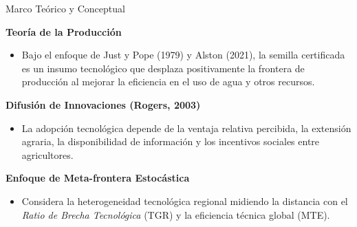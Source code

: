 \documentclass[t]{beamer}
\begin{document}
\begin{frame}[t]{Marco Teórico y Conceptual}
\hspace{0.2cm}
\begin{minipage}{0.92\textwidth}
\vspace{-0.4cm}
    \textbf{Teoría de la Producción}
    \vspace{0.05cm}
        \begin{itemize}
            \justifying
            \item Bajo el enfoque de Just y Pope (1979) y Alston (2021), la semilla certificada es un insumo tecnológico que desplaza positivamente la frontera de producción al mejorar la eficiencia en el uso de agua y otros recursos.
        \end{itemize}
        
    \vspace{0.05cm}
    \normalsize
    \textbf{Difusión de Innovaciones (Rogers, 2003)}
        \begin{itemize}
            \justifying
            \item La adopción tecnológica depende de la ventaja relativa percibida, la extensión agraria, la disponibilidad de información y los incentivos sociales entre agricultores.
        \end{itemize}
    
    \vspace{0.05cm}
    \normalsize
    \textbf{Enfoque de Meta-frontera Estocástica}
        \begin{itemize}
            \justifying
            \item Considera la heterogeneidad tecnológica regional midiendo la distancia con el \textit{Ratio de Brecha Tecnológica} (TGR) y la eficiencia técnica global (MTE).
        \end{itemize}
        
\end{minipage}
\end{frame}
\end{document}
